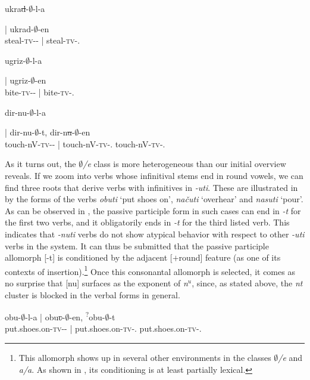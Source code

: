 \documentclass[output=paper,colorlinks,citecolor=brown]{langscibook}
\begin{document}
\ea\label{str:ex:pass}
	\ea \gll \parbox{2.7cm}{ukra\sout{d}-$∅$-l-a} | ukrad-$∅$-en\\ 
steal-\textsc{tv}-{\PST-\FEM} | steal-\textsc{tv}-{\PASS.\PTCP}\\
\glt \label{str:ex:pass-a}

\ex \gll \parbox{2.7cm}{ugriz-$∅$-l-a} | ugriz-$∅$-en\\ 
bite-\textsc{tv}-{\PST-\FEM} | bite-\textsc{tv}-{\PASS.\PTCP}\\
\glt \label{str:ex:pass-b}

\z

\ex\label{str:ex:pass1}
	
 \gll \parbox{3.3cm}{dir-nu-$∅$-l-a} | dir-nu-$∅$-t, \minsp{*} dir-n\sout{u}-$∅$-en\\ 
touch-nV-\textsc{tv}-{\PST-\FEM} | touch-nV\textsc{-tv}-{\PASS.\PTCP} {} touch-nV-\textsc{tv}-{\PASS.\PTCP}\\
\glt \label{str:ex:pass1-a}

\z


\noindent As it turns out, the \textit{$∅$/e} class is more heterogeneous than our initial overview reveals. If we zoom into verbs whose infinitival stems end in round vowels, we can find three roots that derive verbs with infinitives in \textit{-uti}. These are illustrated in  by the forms of the verbs \textit{obuti} `put shoes on', \textit{načuti} `overhear' and \textit{nasuti} `pour'. As can be observed in , the passive participle form in such cases can end in \textit{-t} for the first two verbs, and it obligatorily ends in \textit{-t} for the third listed verb. This indicates that \textit{-nuti} verbs do not show atypical behavior with respect to other \textit{-uti} verbs in the system. It can thus be submitted that the passive participle allomorph [-t] is conditioned by the adjacent [$+$round] feature (as one of its contexts of insertion).\footnote{This allomorph shows up in several other environments in the classes \textit{$∅$/e} and \textit{a/a}. As shown in \citet{Beslin2023}, its conditioning is at least partially lexical.} Once this consonantal allomorph is selected, it comes as no surprise that [nu] surfaces as the exponent of  \textit{n$^u$}, since, as stated above, the \textit{nt} cluster is blocked in the verbal forms in general.   

\ea\label{str:ex:pass2}
	\ea \gll obu-$∅$-l-a | obuʋ-$∅$-en, \newline \textsuperscript{?}obu-$∅$-t\\ 
put.shoes.on-\textsc{tv}-{\PST-\FEM} | put.shoes.on-\textsc{tv}-{\PASS.\PTCP} put.shoes.on-\textsc{tv}-{\PASS.\PTCP}\\
\glt \label{str:ex:pass2-a}
\end{document}
